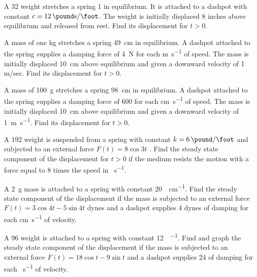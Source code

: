 \begin{exerciselist}
\item\label{exer:6.2.14}A \qty{32}{\pound} weight stretches a spring \qty{1}{\foot} in equilibrium. It is attached
to a dashpot with constant $c=\qty{12}{\pound\second\per\foot}$. The weight is initially
displaced 8 inches above equilibrium and released from rest. Find its
displacement for $t>0$.

\item\label{exer:6.2.15}A mass of one \unit{\kilo\gram} stretches a spring \qty{49}{\centi\meter} in equilibrium. A dashpot
attached to the spring supplies a damping force of \qty{4}{\newton} for each \unit{\meter\per\second}
of speed. The mass is initially displaced \qty{10}{\centi\meter} above equilibrium and
given a downward velocity of 1 m/sec. Find its displacement for $t>0$.

\item\label{exer:6.2.16}A mass of \qty{100}{\gram} stretches a spring \qty{98}{\centi\meter} in equilibrium. A dashpot
attached to the spring supplies a damping force of \qty{600}{\dyne} for each
\unit{\centi\meter\per\second} of speed. The mass is initially displaced \qty{10}{\centi\meter} above
equilibrium and given a downward velocity of \qty{1}{\meter\per\second}. Find its
displacement for $t>0$.

\item\label{exer:6.2.17}A \qty{192}{\pound} weight is suspended from a spring with constant $k=\qty{6}{\pound\per\foot}$
and subjected to an external force $F(t)=8\cos3t$ \unit{\pound}. Find the steady
state component of the displacement for $t>0$ if the medium resists
the motion with a force  equal to 8 times the speed in
\unit{\feet\per\second}.

\item\label{exer:6.2.18}A \qty{2}{\gram} mass is attached to a spring with constant \qty{20}{\dyne\per\centi\meter}. Find the
steady state component of the displacement if the mass is subjected to
an external force $F(t)=3\cos4t-5\sin4t$ dynes and a dashpot supplies
4 dynes of damping for each \unit{\centi\meter\per\second} of velocity.

\item\label{exer:6.2.19}\CGex
A \qty{96}{\pound} weight is attached to a spring with constant \qty{12}{\pound\per\foot}. Find
and graph the steady state component of the displacement if the mass is
subjected to an external force $F(t)=18\cos t-9\sin t$ \unit{\pound} and a
dashpot supplies \qty{24}{\pound} of damping for each \unit{\foot\per\second} of velocity.


\end{exerciselist}
